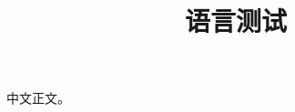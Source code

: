\documentclass[lang=zh]{SUSTechHomework}
\title{语言测试}
\begin{document}
\maketitle
中文正文。
\end{document}
